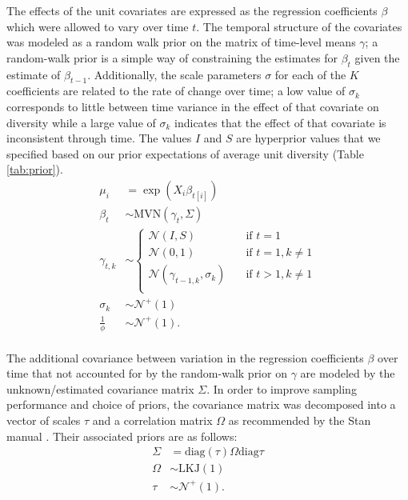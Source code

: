 \documentclass[12pt,letterpaper]{article}
\begin{document}
The effects of the unit covariates are expressed as the regression coefficients \(\beta\) which were allowed to vary over time \(t\). The temporal structure of the covariates was modeled as a random walk prior on the matrix of time-level means \(\gamma\); a random-walk prior is a simple way of constraining the estimates for \(\beta_{t}\) given the estimate of \(\beta_{t - 1}\). Additionally, the scale parameters \(\sigma\) for each of the \(K\) coefficients are related to the rate of change over time; a low value of \(\sigma_{k}\) corresponds to little between time variance in the effect of that covariate on diversity while a large value of \(\sigma_{k}\) indicates that the effect of that covariate is inconsistent through time. The values \(I\) and \(S\) are hyperprior values that we specified based on our prior expectations of average unit diversity (Table \ref{tab:prior}).
\begin{equation}
  \begin{aligned}
    \mu_{i} &= \exp(X_{i} \beta_{t[i]}) \\
    \beta_{t} &\sim \text{MVN}(\gamma_{t}, \Sigma) \\
    \gamma_{t, k} &\sim 
    \begin{cases}
      \mathcal{N}(I, S) & \quad \text{if } t = 1 \\
      \mathcal{N}(0, 1) & \quad \text{if } t = 1, k \neq 1 \\
      \mathcal{N}(\gamma_{t - 1, k}, \sigma_{k}) & \quad \text{if } t > 1, k \neq 1 \\
    \end{cases} \\
    \sigma_{k} &\sim \mathcal{N}^{+}(1) \\ 
    \frac{1}{\phi} &\sim \mathcal{N}^{+}(1). \\
  \end{aligned}
\end{equation}

The additional covariance between variation in the regression coefficients \(\beta\) over time that not accounted for by the random-walk prior on \(\gamma\) are modeled by the unknown/estimated covariance matrix \(\Sigma\). In order to improve sampling performance and choice of priors, the covariance matrix was decomposed into a vector of scales \(\tau\) and a correlation matrix \(\Omega\) as recommended by the Stan manual \citep{StanManual}. Their associated priors are as follows:
\begin{equation}
  \begin{aligned}
    \Sigma &= \text{diag}(\tau) \Omega \text{diag}{\tau} \\
    \Omega &\sim \text{LKJ}(1) \\
    \tau &\sim \mathcal{N}^{+}(1). \\
  \end{aligned}
\end{equation}
\end{document}
